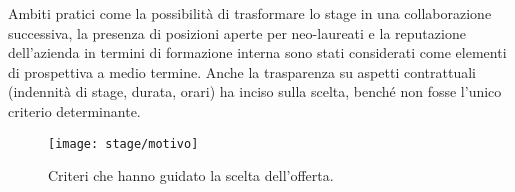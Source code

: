 Ambiti pratici come la possibilità di trasformare lo stage in una collaborazione successiva, la presenza di posizioni aperte per neo-laureati e 
la reputazione dell’azienda in termini di formazione interna sono stati considerati come elementi di prospettiva a medio termine. Anche la trasparenza su aspetti contrattuali 
(indennità di stage, durata, orari) ha inciso sulla scelta, benché non fosse l’unico criterio determinante.

\begin{figure}[htbp]
    \centering
    \texttt{[image: stage/motivo]}
    \caption{Criteri che hanno guidato la scelta dell’offerta.}
    \label{fig:motivo}
\end{figure}

